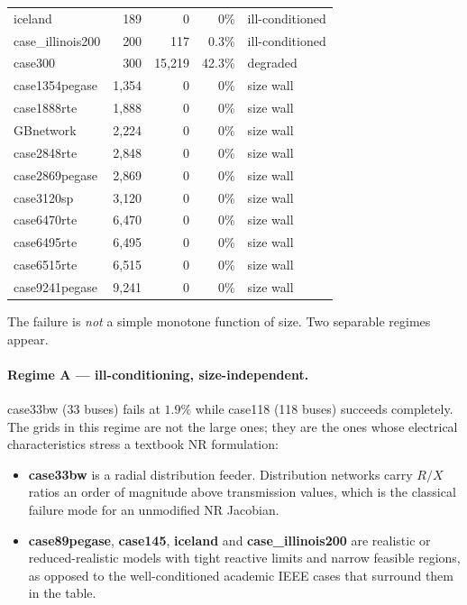 \documentclass{article}
\newcommand{\cwarn}[1]{\textcolor{warn}{#1}}
\newcommand{\cbad}[1]{\textcolor{bad}{#1}}
\begin{document}
\begin{longtable}{l r r r l}
iceland           & 189   & \cbad{0}        & 0\%    & \cbad{ill-conditioned} \\
case\_illinois200 & 200   & \cbad{117}      & 0.3\%  & \cbad{ill-conditioned} \\
case300           & 300   & \cwarn{15{,}219} & 42.3\% & \cwarn{degraded} \\
case1354pegase    & 1{,}354 & \cbad{0}      & 0\%    & \cbad{size wall} \\
case1888rte       & 1{,}888 & \cbad{0}      & 0\%    & \cbad{size wall} \\
GBnetwork         & 2{,}224 & \cbad{0}      & 0\%    & \cbad{size wall} \\
case2848rte       & 2{,}848 & \cbad{0}      & 0\%    & \cbad{size wall} \\
case2869pegase    & 2{,}869 & \cbad{0}      & 0\%    & \cbad{size wall} \\
case3120sp        & 3{,}120 & \cbad{0}      & 0\%    & \cbad{size wall} \\
case6470rte       & 6{,}470 & \cbad{0}      & 0\%    & \cbad{size wall} \\
case6495rte       & 6{,}495 & \cbad{0}      & 0\%    & \cbad{size wall} \\
case6515rte       & 6{,}515 & \cbad{0}      & 0\%    & \cbad{size wall} \\
case9241pegase    & 9{,}241 & \cbad{0}      & 0\%    & \cbad{size wall} \\
\bottomrule
\end{longtable}

The failure is \emph{not} a simple monotone function of size.  Two separable
regimes appear.

\paragraph{Regime A --- ill-conditioning, size-independent.}
case33bw (33 buses) fails at $1.9\%$ while case118 (118 buses) succeeds
completely.  The grids in this regime are not the large ones; they are the
ones whose electrical characteristics stress a textbook NR formulation:
\begin{itemize}[leftmargin=1.4em]
  \item \textbf{case33bw} is a radial distribution feeder.  Distribution
    networks carry $R/X$ ratios an order of magnitude above transmission
    values, which is the classical failure mode for an unmodified NR
    Jacobian.
  \item \textbf{case89pegase}, \textbf{case145}, \textbf{iceland} and
    \textbf{case\_illinois200} are realistic or reduced-realistic models with
    tight reactive limits and narrow feasible regions, as opposed to the
    well-conditioned academic IEEE cases that surround them in the table.
\end{itemize}
\end{document}
